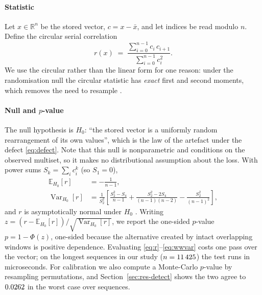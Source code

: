 \documentclass[a4paper,fleqn]{cas-sc}
\begin{document}
\paragraph{Statistic}
Let $x \in \mathbb{R}^n$ be the stored vector, $c = x - \bar{x}$, and let indices
be read modulo $n$. Define the circular serial correlation
\begin{equation}
r(x) \;=\; \frac{\sum_{i=0}^{n-1} c_i\, c_{i+1}}{\sum_{i=0}^{n-1} c_i^2}.
\label{eq:r}
\end{equation}
We use the circular rather than the linear form for one reason: under the
randomisation null the circular statistic has \emph{exact} first and second
moments, which removes the need to resample \citep{wald1943}.

\paragraph{Null and $p$-value}
The null hypothesis is $H_0$: ``the stored vector is a uniformly random
rearrangement of its own values'', which is the law of the artefact under the
defect \eqref{eq:defect}. Note that this null is nonparametric and conditions on
the observed multiset, so it makes no distributional assumption about the loss.
With power sums $S_k = \sum_i c_i^k$ (so $S_1 = 0$),
\begin{align}
\mathbb{E}_{H_0}[r] &= -\frac{1}{n-1}, \label{eq:wwmean}\\
\operatorname{Var}_{H_0}[r] &= \frac{1}{S_2^{2}}
\left[\frac{S_2^{2}-S_4}{n-1}
 + \frac{S_2^{2}-2S_4}{(n-1)(n-2)}
 - \frac{S_2^{2}}{(n-1)^{2}}\right],
\label{eq:wwvar}
\end{align}
and $r$ is asymptotically normal under $H_0$ \citep{wald1943}. Writing
$z = (r - \mathbb{E}_{H_0}[r])/\sqrt{\operatorname{Var}_{H_0}[r]}$, we report the
one-sided $p$-value $p = 1 - \Phi(z)$,
one-sided because the alternative created by intact overlapping windows is
positive dependence. Evaluating \eqref{eq:r}--\eqref{eq:wwvar} costs one pass over
the vector; on the longest sequences in our study
($n = 11\,425{}$) the test runs in microseconds. For calibration we also
compute a Monte-Carlo $p$-value by resampling permutations, and
Section~\ref{sec:res-detect} shows the two agree to
$0.0262{}$ in the worst case over \NumCalibSeq{} sequences.
\end{document}
